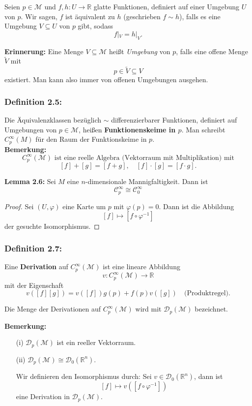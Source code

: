 \documentclass[fleqn, 12pt, letterpaper]{article}
\begin{document}
Seien \( p \in \mathcal{M} \) und \( f, h: U \to \mathbb{R} \) glatte Funktionen, definiert auf einer Umgebung \( U \) von \( p \).
Wir sagen, \( f \) ist äquivalent zu \( h \) (geschrieben \( f \sim h \)), falls es eine Umgebung \( V \subseteq U \) von \( p \) gibt, sodass
\[
f|_V = h|_V.
\]

\textbf{Erinnerung:} 
Eine Menge \( V \subseteq \mathcal{M} \) heißt \emph{Umgebung} von \( p \), falls eine offene Menge \(\widetilde{V}\) mit
\[
p \in \widetilde{V} \subseteq V
\]
existiert. 
Man kann also immer von offenen Umgebungen ausgehen.

\subsubsection*{Definition 2.5:}
Die Äquivalenzklassen bezüglich $\sim$ differenzierbarer Funktionen, definiert auf Umgebungen von \( p \in \mathcal{M} \), heißen \textbf{Funktionenskeime in \( p \)}. 
Man schreibt \(C^{\infty}_p(M)\) für den Raum der Funktionskeime in $p$.\\

\textbf{Bemerkung:} 
\[
C_p^\infty(\mathcal{M}) \text{ ist eine reelle Algebra (Vektorraum mit Multiplikation) mit}
\]
\[
[f] + [g] = [f+g], \quad [f] \cdot [g] = [f \cdot g].
\]

\textbf{Lemma 2.6:} 
Sei \(M\) eine \(n\)-dimensionale Mannigfaltigkeit. Dann ist
\[
\mathcal{C}_p^\infty \cong \mathcal{C}_{0} ^\infty
\]
\begin{proof}
    Sei \((U, \varphi)\) eine Karte um \(p\) mit \(\varphi(p) = 0\). Dann ist die Abbildung
\[
[f] \mapsto [f \circ \varphi^{-1}]
\]
der gesuchte Isomorphismus.
\end{proof}
\subsubsection*{Definition 2.7:}
Eine \textbf{Derivation} auf \( C_p^\infty(\mathcal{M}) \) ist eine lineare Abbildung
\[
v: C_p^\infty(\mathcal{M}) \to \mathbb{R}
\]
mit der Eigenschaft
\[
v([f][g]) = v([f])g(p) + f(p)v([g]) \quad \text{(Produktregel)}.
\]

Die Menge der Derivationen auf \( C_p^\infty(\mathcal{M}) \) wird mit \( \mathcal{D}_p(\mathcal{M}) \) bezeichnet.

\vspace{0.5cm}

\textbf{Bemerkung:}
\begin{itemize}
    \item[(i)] \( \mathcal{D}_p(\mathcal{M}) \) ist ein reeller Vektorraum.
    \item[(ii)] \( \mathcal{D}_p(\mathcal{M}) \cong \mathcal{D}_0(\mathbb{R}^n) \).
    
    Wir definieren den Isomorphismus durch: Sei \( v \in \mathcal{D}_0(\mathbb{R}^n) \), dann ist
    \[
    [f] \mapsto v([f \circ \varphi^{-1}])
    \]
    eine Derivation in \( \mathcal{D}_p(\mathcal{M}) \).
\end{itemize}
\end{document}
